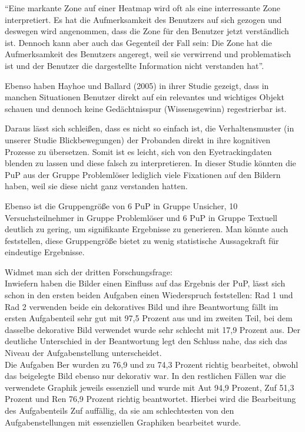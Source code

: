 ``Eine markante Zone auf einer Heatmap wird oft als eine interressante Zone interpretiert. Es hat die Aufmerksamkeit des Benutzers auf sich gezogen und deswegen wird angenommen, dass die Zone für den Benutzer jetzt verständlich ist. Dennoch kann aber auch das Gegenteil der Fall sein: Die Zone hat die Aufmerksamkeit des Benutzers angeregt, weil sie verwirrend und problematisch ist und der Benutzer die dargestellte Information nicht verstanden hat''\cite{hyrskykari2008gaze}.

Ebenso haben Hayhoe und Ballard (2005) in ihrer Studie gezeigt, dass in manchen Situationen Benutzer direkt auf ein relevantes und wichtiges Objekt schauen und dennoch keine Gedächtnisspur (Wissensgewinn) regestrierbar ist\cite{hayhoe2005eye}. 

Daraus lässt sich schleißen, dass es nicht so einfach ist, die Verhaltensmuster (in unserer Studie Blickbewegungen) der Probanden direkt in ihre kognitiven Prozesse zu übersetzen. Somit ist es leicht, sich von den Eyetrackingdaten blenden zu lassen und diese falsch zu interpretieren. In dieser Studie könnten die \gls{PuP} aus der Gruppe Problemlöser lediglich viele Fixationen auf den Bildern haben, weil sie diese nicht ganz verstanden hatten. 

Ebenso ist die Gruppengröße von 6 \gls{PuP} in Gruppe Unsicher, 10 Versuchsteilnehmer in Gruppe Problemlöser und 6 \gls{PuP} in Gruppe Textuell deutlich zu gering, um signifikante Ergebnisse zu generieren. Man könnte auch feststellen, diese Gruppengröße bietet zu wenig statistische Aussagekraft für eindeutige Ergebnisse. 

Widmet man sich der dritten Forschungsfrage:\\
Inwiefern haben die Bilder einen Einfluss auf das Ergebnis der \gls{PuP}, lässt sich schon in den ersten beiden Aufgaben einen Wiederspruch feststellen: \gls{Rad} 1 und \gls{Rad} 2 verwenden beide ein dekoratives Bild und ihre Beantwortung fällt im ersten Aufgabenteil sehr gut mit 97,5 Prozent aus und im zweiten Teil, bei dem dasselbe dekorative Bild verwendet wurde sehr schlecht mit 17,9 Prozent aus. Der deutliche Unterschied in der Beantwortung legt den Schluss nahe, das sich das Niveau der Aufgabenstellung unterscheidet.\\
Die Aufgaben \gls{Ber} wurden zu 76,9 und zu 74,3 Prozent richtig bearbeitet, obwohl das beigelegte Bild ebenso nur dekorativ war. In den restlichen Fällen war die verwendete Graphik jeweils essenziell und wurde mit \gls{Aut} 94,9 Prozent, \gls{Zuf} 51,3 Prozent und \gls{Ren} 76,9 Prozent richtig beantwortet. Hierbei wird die Bearbeitung des Aufgabenteils \gls{Zuf} auffällig, da sie am schlechtesten von den Aufgabenstellungen mit essenziellen Graphiken bearbeitet wurde. 


